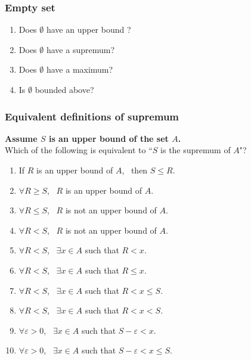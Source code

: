 \begin{frame}[t]
	\frametitle{Empty set}

	\begin{enumerate}
		\item Does $\emptyset$ have an upper bound ?

		\item Does $\emptyset$ have a supremum?

		\item Does $\emptyset$ have a maximum?

		\item Is $\emptyset$ bounded above?
	\end{enumerate}
\end{frame}

\begin{frame}[t]
	\fontsize{13}{13}\selectfont
	\frametitle{Equivalent definitions of supremum}

	{\bfseries Assume $S$ is an upper bound of the set $A$.} \\ Which of the following
	is equivalent to ``$S$ is the supremum of $A$"?
	\vspace{.2cm}
	\begin{enumerate}
		\item If $R$ is an upper bound of $A$, \, then $S \leq R$.
			\vspace{.2cm}

		\item $\displaystyle \forall R \geq S$, \, $R$ is an upper bound of $A$.

		\item $\displaystyle \forall R \leq S$, \, $R$ is not an upper bound of $A$.

		\item $\displaystyle \forall R < S$, \, $R$ is not an upper bound of $A$.
			\vspace{.2cm}

		\item $\displaystyle \forall R < S$, \, $\displaystyle \exists x \in A$ \;
			such that \; $\displaystyle R < x$.

		\item $\displaystyle \forall R < S$, \, $\displaystyle \exists x \in A$ \;
			such that \; $\displaystyle R \leq x$.

		\item $\displaystyle \forall R < S$, \, $\displaystyle \exists x \in A$ \;
			such that \; $\displaystyle R < x \leq S$.

		\item $\displaystyle \forall R < S$, \, $\displaystyle \exists x \in A$ \;
			such that \; $\displaystyle R < x < S$.
			\vspace{.2cm}

		\item $\displaystyle \forall \varepsilon>0$, \; \,
			$\displaystyle \exists x \in A$ \; such that \;
			$\displaystyle S - \varepsilon < x$.

		\item $\displaystyle \forall \varepsilon>0$, \; \,
			$\displaystyle \exists x \in A$ \; such that \;
			$\displaystyle S - \varepsilon < x \leq S$.
	\end{enumerate}
\end{frame}

